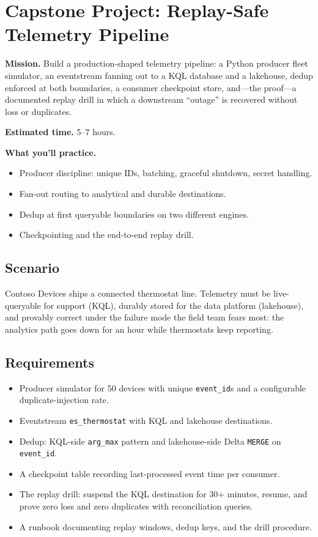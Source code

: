 \section{Capstone Project: Replay-Safe Telemetry Pipeline}\label{sec:ch13-capstone}

\begin{capstonebox}
\textbf{Mission.} Build a production-shaped telemetry pipeline: a Python producer fleet simulator, an eventstream fanning out to a KQL database and a lakehouse, dedup enforced at both boundaries, a consumer checkpoint store, and---the proof---a documented replay drill in which a downstream ``outage'' is recovered without loss or duplicates.

\textbf{Estimated time.} 5--7 hours.

\textbf{What you'll practice.}
\begin{itemize}
    \item Producer discipline: unique IDs, batching, graceful shutdown, secret handling.
    \item Fan-out routing to analytical and durable destinations.
    \item Dedup at first queryable boundaries on two different engines.
    \item Checkpointing and the end-to-end replay drill.
\end{itemize}
\end{capstonebox}

\subsection*{Scenario}
Contoso Devices ships a connected thermostat line. Telemetry must be live-queryable for support (KQL), durably stored for the data platform (lakehouse), and provably correct under the failure mode the field team fears most: the analytics path goes down for an hour while thermostats keep reporting.

\subsection*{Requirements}
\begin{itemize}
    \item Producer simulator for 50 devices with unique \texttt{event\_id}s and a configurable duplicate-injection rate.
    \item Eventstream \texttt{es\_thermostat} with KQL and lakehouse destinations.
    \item Dedup: KQL-side \texttt{arg\_max} pattern and lakehouse-side Delta \texttt{MERGE} on \texttt{event\_id}.
    \item A checkpoint table recording last-processed event time per consumer.
    \item The replay drill: suspend the KQL destination for 30+ minutes, resume, and prove zero loss and zero duplicates with reconciliation queries.
    \item A runbook documenting replay windows, dedup keys, and the drill procedure.
\end{itemize}

